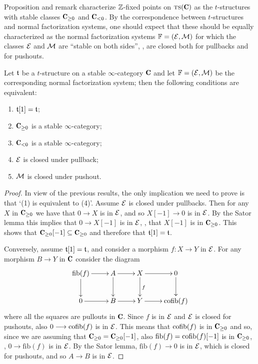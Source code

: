 Proposition  and remark  characterize $\mathbb{Z} $-fixed points on $\ts(\C)$ as the $t$-structures with stable classes $\C_{\geq 0}$ and $\C_{<0}$. By the correspondence between $t$-structures and normal factorization systems, one should expect that these should be equally characterized as the normal factorization systems  $\mathbb{F}=(\mathcal{E},\mathcal{M})$ for which the classes $\mathcal{E}$ and $\mathcal{M}$ are ``stable on both sides'', \ie, are closed both for pullbacks and for pushouts.
\begin{theorem}\label{enactedstableare}
Let $\mathfrak{t}$ be a $t$-structure on a stable $\infty$-category $\C$ and let $\mathbb{F}=(\mathcal{E},\mathcal{M})$ be the corresponding normal factorization system; then the following conditions are equivalent:
\begin{enumerate}
\item $\mathfrak{t}[1]=\mathfrak{t}$;
\item $\C_{\geq 0}$ is a stable $\infty$-category;
\item $\C_{< 0}$ is a stable $\infty$-category;
\item $\mathcal{E}$ is closed under pullback;
\item $\mathcal{M}$ is closed under pushout.
\end{enumerate}
\end{theorem}
\begin{proof}
In view of the previous results, the only implication we need to prove is that `(1) is equivalent to (4)'. Assume $\mathcal{E}$ is closed under pullbacks. Then for any $X$ in $\C_{\geq 0}$ we have that $0\to X$ is in $\mathcal{E}$, and so $X[-1]\to 0$ is in $\mathcal{E}$. By the Sator lemma this implies that $0\to X[-1]$ is in $\mathcal{E}$, \ie, that $X[-1]$ is in $\C_{\geq 0}$. This shows that $\C_{\geq 0}[-1]\subseteq \C_{\geq 0}$ and therefore that $\mathfrak{t}[1]= \mathfrak{t}$. 

Conversely, assume $\mathfrak{t}[1]=\mathfrak{t}$,
and consider a morphism $f\colon X\to Y$ in $\mathcal{E}$. For any morphism $B\to Y$ in $\C$
consider the diagram
\[
\xymatrix{
\mathrm{fib}(f)\ar[r]\ar[d] & A\ar[r]\ar[d] & X\ar[r]\ar[d]^{f} & 0\ar[d]\\
0 \ar[r] & B\ar[r]  & Y\ar[r]  & \cofib(f)
}
\]
where all the squares are pullouts in $\C$. Since $f$ is in $\mathcal{E}$ and $\mathcal{E}$ is closed for pushouts, also $0\longrightarrow \operatorname{cofib}(f)$ is in $\mathcal{E}$. This means that $\operatorname{cofib}(f)$ is in $\C_{\geq 0}$ and so, since we are assuming that $\C_{\geq 0}=\C_{\geq 0}[-1]$, also $\mathrm{fib}(f)=\operatorname{cofib}(f)[-1]$ is in $\C_{\geq 0}$, \ie,  $0\to \mathrm{fib}(f)$ is in $\mathcal{E}$. By the Sator lemma, $\mathrm{fib}(f)\to 0$ is in $\mathcal{E}$, which is closed for pushouts, and so $A\to B$ is in $\mathcal{E}$.
\end{proof}
